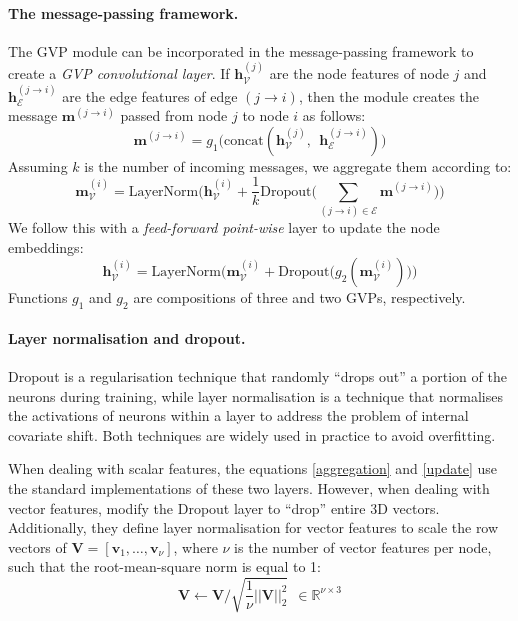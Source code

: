 \paragraph{The message-passing framework.} The GVP module can be incorporated in the message-passing framework to create a \textit{GVP convolutional layer}. If $\mathbf{h}_{\mathcal{V}}^{(j)}$ are the node features of node $j$ and $\mathbf{h}_{\mathcal{E}}^{(j\rightarrow i)}$ are the edge features of edge $(j \rightarrow i)$, then the module creates the message $\mathbf{m}^{(j\rightarrow i)}$ passed from node $j$ to node $i$ as follows:
\begin{equation}
\mathbf{m}^{(j\rightarrow i)} = g_1\Big(\text{concat}(\mathbf{h}_{\mathcal{V}}^{(j)}, ~~\mathbf{h}_{\mathcal{E}}^{(j \rightarrow i)})\Big) 
\end{equation}
Assuming $k$ is the number of incoming messages, we aggregate them according to:
\begin{equation}
\mathbf{m}_{\mathcal{V}}^{(i)}= \text{LayerNorm}\Big(\mathbf{h}_{\mathcal{V}}^{(i)} + \frac{1}{k}\text{Dropout}\big(\sum_{(j \rightarrow i)\in\mathcal{E}}\mathbf{m}^{(j\rightarrow i)}\big)\Big)
\label{aggregation}
\end{equation}
We follow this with a \textit{feed-forward point-wise} layer to update the node embeddings:
\begin{equation}
    \mathbf{h}_{\mathcal{V}}^{(i)}= \text{LayerNorm}\Big(\mathbf{m}_{\mathcal{V}}^{(i)} + \text{Dropout}\big(g_2(\mathbf{m}_{\mathcal{V}}^{(i)})\big)\Big)
\label{update}
\end{equation}
Functions $g_1$ and $g_2$ are compositions of three and two GVPs, respectively.

\paragraph{Layer normalisation and dropout.} Dropout \cite{dropout} is a regularisation technique that randomly ``drops out'' a portion of the neurons during training, while layer normalisation \cite{layernorm} is a technique that normalises the activations of neurons within a layer to address the problem of internal covariate shift. Both techniques are widely used in practice to avoid overfitting. 

When dealing with scalar features, the equations \ref{aggregation} and \ref{update} use the standard implementations of these two layers. However, when dealing with vector features, \citet{gvp1} modify the Dropout layer to ``drop'' entire 3D vectors. Additionally, they define layer normalisation for vector features to scale the row vectors of $\mathbf{V} =[\mathbf{v}_1, \dots, \mathbf{v}_{\nu}]$, where $\nu$ is the number of vector features per node, such that the root-mean-square norm is equal to 1: 
\begin{equation}
    \mathbf{V} \leftarrow \mathbf{V}/\sqrt{\frac{1}{\nu}||\mathbf{V}||_2^2} ~~\in \mathbb{R}^{\nu\times 3}  
\end{equation}


